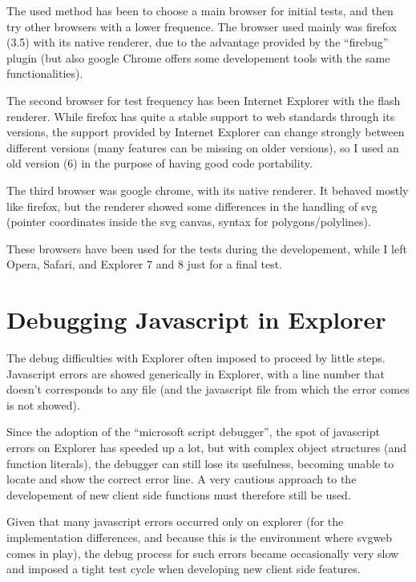 \documentclass[10pt,a4paper,english]{book}
\begin{document}
The used method has been to choose a main browser for initial tests,
and then try other browsers with a lower frequence. The browser used
mainly was firefox (3.5) with its native renderer, due to the advantage
provided by the ``firebug'' plugin (but also google Chrome offers some
developement tools with the same functionalities).

The second browser for test frequency has been Internet Explorer with
the flash renderer. While firefox has quite a stable support to web
standards through its versions, the support provided by Internet
Explorer can change strongly between different versions (many features
can be missing on older versions), so I used an old version (6) in the
purpose of having good code portability.

The third browser was google chrome, with its native renderer. It
behaved mostly like firefox, but the renderer showed some differences
in the handling of svg (pointer coordinates inside the svg canvas,
syntax for polygons/polylines).

These browsers have been used for the tests during the developement,
while I left Opera, Safari, and Explorer 7 and 8 just for a final
test.



\hypertarget{debugging-javascript-in-explorer}{}
\section{Debugging Javascript in Explorer}
\label{debugging-javascript-in-explorer}

The debug difficulties with Explorer often imposed to proceed by
little steps. Javascript errors are showed generically in Explorer,
with a line number that doesn't corresponds to any file (and the
javascript file from which the error comes is not showed).

Since the adoption of the ``microsoft script debugger'', the spot of
javascript errors on Explorer has speeded up a lot, but with complex
object structures (and function literals), the debugger can still lose
its usefulness, becoming unable to locate and show the correct error
line. A very cautious approach to the developement of new client side
functions must therefore still be used.

Given that many javascript errors occurred only on explorer (for the
implementation differences, and because this is the environment where
svgweb comes in play), the debug process for such errors became
occasionally very slow and imposed a tight test cycle when developing
new client side features.
\end{document}
